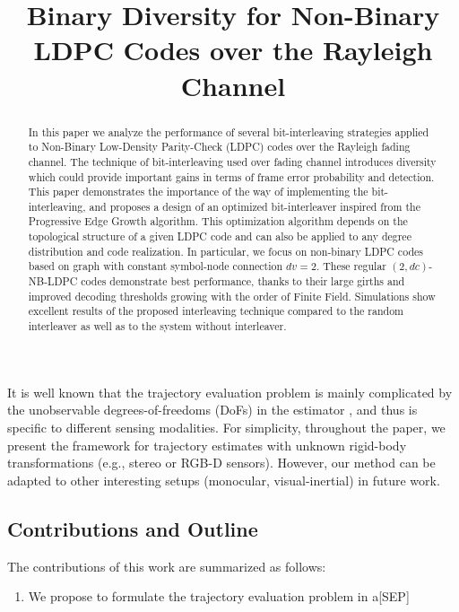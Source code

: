 {It is well known that the trajectory evaluation problem is mainly complicated by the unobservable degrees-of-freedoms (DoFs) in the estimator \cite{khan2017spatial}, and thus is specific to different sensing modalities. For simplicity, throughout the paper, we present the framework for trajectory estimates with unknown rigid-body transformations (e.g., stereo or RGB-D sensors). However, our method can be adapted to other interesting setups (monocular, visual-inertial) in future work.
\subsection{Contributions and Outline}
The contributions of this work are summarized as follows:
\begin{enumerate}
    \item We propose to formulate the trajectory evaluation problem in a[SEP]
\importpackages{}
\graphicspath{ {./images/} }


\title{Binary Diversity for Non-Binary LDPC Codes over the Rayleigh Channel}
\author{
}
\maketitle
\begin{abstract}
In this paper we analyze the performance of several bit-interleaving strategies applied to Non-Binary Low-Density Parity-Check (LDPC) codes over the Rayleigh fading channel. The technique of bit-interleaving used over fading channel introduces diversity which could provide important gains in terms of frame error probability and detection. This paper demonstrates the importance of the way of implementing the bit-interleaving, and proposes a design of an optimized bit-interleaver inspired from the Progressive Edge Growth algorithm. This optimization algorithm depends on the topological structure of a given LDPC code and can also be applied to any degree distribution and code realization. In particular, we focus on non-binary LDPC codes based on graph with constant symbol-node connection $dv=2$. These regular $(2,dc)$-NB-LDPC codes demonstrate best performance, thanks to their large girths and improved decoding thresholds growing with the order of Finite Field. Simulations show excellent results of the proposed interleaving technique compared to the random interleaver as well as to the system without interleaver.
\end{abstract}
\IEEEpeerreviewmaketitle

\end{enumerate}}
